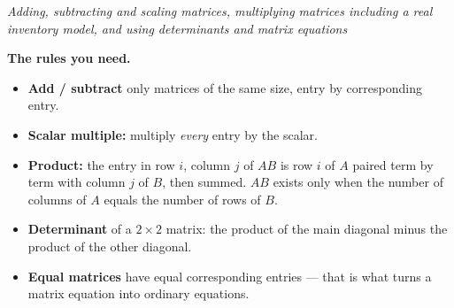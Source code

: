 \documentclass[12pt]{article}
\begin{document}

\begin{center}
\textit{Adding, subtracting and scaling matrices, multiplying matrices
including a real inventory model, and using determinants and matrix equations}
\end{center}

\noindent\textbf{The rules you need.}
\begin{itemize}[leftmargin=1.2cm, itemsep=2pt, topsep=2pt]
\item \textbf{Add / subtract} only matrices of the same size, entry by
corresponding entry.
\item \textbf{Scalar multiple:} multiply \emph{every} entry by the scalar.
\item \textbf{Product:} the entry in row $i$, column $j$ of $AB$ is row $i$ of
$A$ paired term by term with column $j$ of $B$, then summed. $AB$ exists only
when the number of columns of $A$ equals the number of rows of $B$.
\item \textbf{Determinant} of a $2 \times 2$ matrix: the product of the main
diagonal minus the product of the other diagonal.
\item \textbf{Equal matrices} have equal corresponding entries --- that is what
turns a matrix equation into ordinary equations.
\end{itemize}

\vspace{0.1cm}



\end{document}
